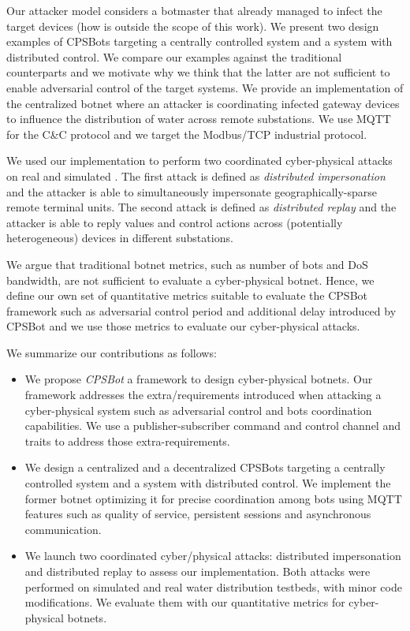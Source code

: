\documentclass[sigconf]{acmart}
\makeatletter
\newcommand{\Botnet}{CPSBot\@\xspace}
\newcommand{\Botnets}{CPSBots\@\xspace}
\newcommand{\CC}{C\&C\@\xspace}
\makeatother
\begin{document}
Our attacker model considers a botmaster that already managed to infect
the target devices (how is outside the scope of this work). We present
two design examples of \Botnets targeting a centrally controlled system
and a system with distributed control.
We compare our examples against the traditional counterparts
and we motivate why we think that the latter are not
sufficient to enable adversarial control of the target systems.
We provide an implementation of the centralized botnet where an attacker is
coordinating infected gateway devices to influence the distribution of water
across remote substations. We use MQTT for the \CC protocol and we target the
Modbus/TCP industrial protocol.

We used our implementation to perform two coordinated cyber-physical attacks on
real and simulated \wadilong. The first attack is defined as
\emph{distributed impersonation} and the attacker is able to simultaneously
impersonate geographically-sparse remote terminal units. The second attack is
defined as \emph{distributed replay} and the attacker is able to reply values
and control actions across (potentially heterogeneous) devices in different
substations.

We argue that traditional botnet metrics, such as number of bots and DoS
bandwidth, are not sufficient to evaluate a cyber-physical
botnet. Hence, we define our own set of quantitative metrics suitable
to evaluate the \Botnet framework such as adversarial control period and
additional delay introduced by \Botnet and we use those metrics to evaluate our
cyber-physical attacks.

We summarize our contributions as follows:

\begin{itemize}

\item  We propose \emph{\Botnet } a framework to design
  cyber-physical botnets. Our framework addresses the
        extra\-/requirements introduced when attacking a cyber-physical system
        such as adversarial control and bots coordination capabilities.
        We use a publisher-subscriber command and control channel and
        traits to address those extra-requirements.

\item We design a centralized and a decentralized \Botnets targeting a
    centrally controlled system and a system with distributed control. We implement
    the former botnet optimizing it for precise coordination among
    bots using MQTT features such as quality of
    service, persistent sessions and asynchronous communication.

  \item We launch two coordinated cyber\-/physical
    attacks: dis\-tri\-bu\-ted impersonation and distributed replay to assess
    our implementation.
    Both attacks were performed on simulated and real water distribution
    testbeds, with minor code modifications. We evaluate them with
    our quantitative metrics for cyber-physical botnets.

\end{itemize}
\end{document}
